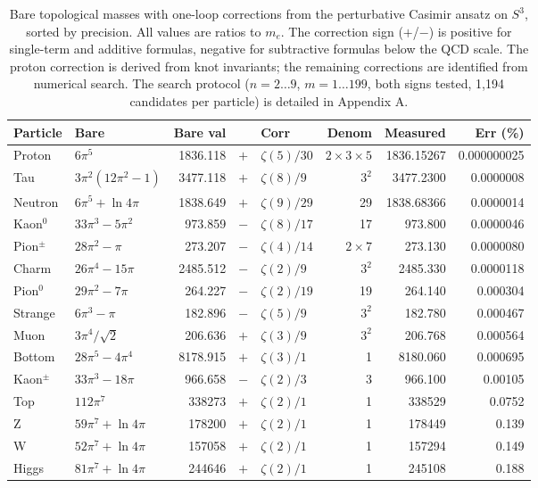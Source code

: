 \begin{table}[H]
\centering
\footnotesize
\begin{tabular}{l l r c l r r r}
\toprule
\textbf{Particle} & \textbf{Bare} & \textbf{Bare val} & & \textbf{Corr} & \textbf{Denom} & \textbf{Measured} & \textbf{Err (\%)} \\
\midrule
Proton & $6\pi^5$ & 1836.118 & $+$ & $\zeta(5)/30$ & $2{\times}3{\times}5$ & 1836.15267 & 0.000000025 \\
Tau & $3\pi^2(12\pi^2{-}1)$ & 3477.118 & $+$ & $\zeta(8)/9$ & $3^2$ & 3477.2300 & 0.0000008 \\
Neutron & $6\pi^5{+}\ln 4\pi$ & 1838.649 & $+$ & $\zeta(9)/29$ & 29 & 1838.68366 & 0.0000014 \\
Kaon$^0$ & $33\pi^3{-}5\pi^2$ & 973.859 & $-$ & $\zeta(8)/17$ & 17 & 973.800 & 0.0000046 \\
Pion$^\pm$ & $28\pi^2{-}\pi$ & 273.207 & $-$ & $\zeta(4)/14$ & $2{\times}7$ & 273.130 & 0.0000080 \\
Charm & $26\pi^4{-}15\pi$ & 2485.512 & $-$ & $\zeta(2)/9$ & $3^2$ & 2485.330 & 0.0000118 \\
Pion$^0$ & $29\pi^2{-}7\pi$ & 264.227 & $-$ & $\zeta(2)/19$ & 19 & 264.140 & 0.000304 \\
Strange & $6\pi^3{-}\pi$ & 182.896 & $-$ & $\zeta(5)/9$ & $3^2$ & 182.780 & 0.000467 \\
Muon & $3\pi^4/\sqrt{2}$ & 206.636 & $+$ & $\zeta(3)/9$ & $3^2$ & 206.768 & 0.000564 \\
Bottom & $28\pi^5{-}4\pi^4$ & 8178.915 & $+$ & $\zeta(3)/1$ & 1 & 8180.060 & 0.000695 \\
Kaon$^\pm$ & $33\pi^3{-}18\pi$ & 966.658 & $-$ & $\zeta(2)/3$ & 3 & 966.100 & 0.00105 \\
Top & $112\pi^7$ & 338273 & $+$ & $\zeta(2)/1$ & 1 & 338529 & 0.0752 \\
Z & $59\pi^7{+}\ln 4\pi$ & 178200 & $+$ & $\zeta(2)/1$ & 1 & 178449 & 0.139 \\
W & $52\pi^7{+}\ln 4\pi$ & 157058 & $+$ & $\zeta(2)/1$ & 1 & 157294 & 0.149 \\
Higgs & $81\pi^7{+}\ln 4\pi$ & 244646 & $+$ & $\zeta(2)/1$ & 1 & 245108 & 0.188 \\
\bottomrule
\end{tabular}
\caption{Bare topological masses with one-loop corrections from the perturbative Casimir ansatz on $S^3$, sorted by precision. All values are ratios to $m_e$. The correction sign ($+$/$-$) is positive for single-term and additive formulas, negative for subtractive formulas below the QCD scale. The proton correction is derived from knot invariants; the remaining corrections are identified from numerical search. The search protocol ($n = 2 \ldots 9$, $m = 1 \ldots 199$, both signs tested, 1{,}194 candidates per particle) is detailed in Appendix A.}
\label{tab:zeta}
\end{table}

